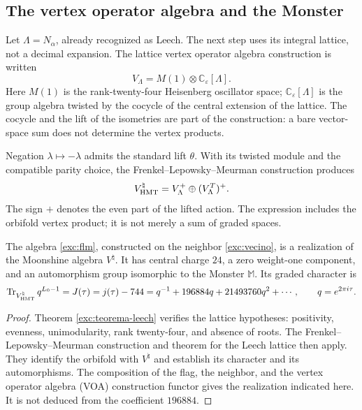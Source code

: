 \subsection{The vertex operator algebra and the Monster}
\label{exc:voa}

Let $\Lambda=N_\alpha$, already recognized as Leech. The next step
uses its integral lattice, not a decimal expansion. The lattice
vertex operator algebra construction is written
\[
 V_\Lambda=M(1)\otimes\mathbb C_\varepsilon[\Lambda].
\]
Here $M(1)$ is the rank-twenty-four Heisenberg oscillator
space; $\mathbb C_\varepsilon[\Lambda]$ is the group algebra
twisted by the cocycle of the central extension of the lattice. The
cocycle and the lift of the isometries are part of the
construction: a bare vector-space sum does not determine the vertex
products.

Negation $\lambda\mapsto-\lambda$ admits the standard lift
$\theta$. With its twisted module and the compatible parity choice,
the Frenkel--Lepowsky--Meurman construction produces
\begin{equation}
 V^\natural_{\rm HMT}
   =V_\Lambda^+\oplus(V_\Lambda^T)^+.
 \label{exc:flm}
\end{equation}
The sign $+$ denotes the even part of the lifted action. The expression
includes the orbifold vertex product; it is not merely a sum
of graded spaces.

\begin{theorem}
\label{exc:moonshine}
The algebra \eqref{exc:flm}, constructed on the neighbor
\eqref{exc:vecino}, is a realization of the Moonshine algebra
$V^\natural$. It has central charge $24$, a zero weight-one component,
and an automorphism group isomorphic to the Monster $\mathbb M$. Its graded
character is
\begin{equation}
 \operatorname{Tr}_{V^\natural_{\rm HMT}}q^{L_0-1}
   =J(\tau)=j(\tau)-744
   =q^{-1}+196884q+21493760q^2+\cdots,
 \qquad q=e^{2\pi i\tau}.
 \label{exc:j}
\end{equation}
\end{theorem}

\begin{proof}
Theorem \ref{exc:teorema-leech} verifies the lattice hypotheses:
positivity, evenness, unimodularity, rank twenty-four, and absence of
roots. The Frenkel--Lepowsky--Meurman construction and theorem
for the Leech lattice then apply. They identify
the orbifold with $V^\natural$ and establish its character and its
automorphisms. The composition of the flag, the neighbor, and the vertex
operator algebra (VOA) construction functor gives the realization indicated
here. It is not deduced from the coefficient $196884$.
\end{proof}

